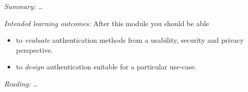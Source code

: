 \emph{Summary:}
\dots

\emph{Intended learning outcomes:}
After this module you should be able
\begin{itemize}
  \item to \emph{evaluate} authentication methods from a usability, security 
    and privacy perspective.
  \item to \emph{design} authentication suitable for a particular use-case.
\end{itemize}

\emph{Reading:}
\dots
